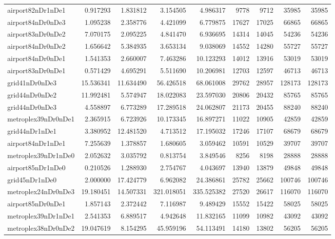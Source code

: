 \begin{longtable}{|l|r|r|r|r|r|r|r|r|}
airport82nDr1nDe1 & 0.917293 & 1.831812 & 3.154505 & 4.986317 & 9778 & 9712 & 35985 & 35985 \\
airport84nDr0nDe3 & 1.095238 & 2.358776 & 4.421099 & 6.779875 & 17627 & 17025 & 66865 & 66865 \\
airport83nDr0nDe2 & 7.070175 & 2.095225 & 4.841470 & 6.936695 & 14314 & 14045 & 54236 & 54236 \\
airport84nDr0nDe2 & 1.656642 & 5.384935 & 3.653134 & 9.038069 & 14552 & 14280 & 55727 & 55727 \\
airport84nDr0nDe1 & 1.541353 & 2.660007 & 7.463286 & 10.123293 & 14012 & 13916 & 53019 & 53019 \\
airport83nDr0nDe1 & 0.571429 & 4.695291 & 5.511690 & 10.206981 & 12703 & 12597 & 46713 & 46713 \\
grid41nDr0nDe3 & 15.536341 & 11.634490 & 56.426518 & 68.061008 & 29762 & 28957 & 128173 & 128173 \\
grid44nDr0nDe2 & 11.992481 & 5.574947 & 18.022083 & 23.597030 & 20806 & 20432 & 85765 & 85765 \\
grid44nDr0nDe3 & 4.558897 & 6.773289 & 17.289518 & 24.062807 & 21173 & 20455 & 88240 & 88240 \\
metroplex39nDr0nDe1 & 2.365915 & 6.723926 & 10.173345 & 16.897271 & 11022 & 10905 & 42859 & 42859 \\
grid44nDr1nDe1 & 3.380952 & 12.481520 & 4.713512 & 17.195032 & 17246 & 17107 & 68679 & 68679 \\
airport84nDr1nDe1 & 7.255639 & 1.378857 & 1.680605 & 3.059462 & 10591 & 10529 & 39707 & 39707 \\
metroplex39nDr1nDe0 & 2.052632 & 3.035792 & 0.813754 & 3.849546 & 8256 & 8198 & 28888 & 28888 \\
airport85nDr1nDe0 & 0.210526 & 1.288930 & 2.754767 & 4.043697 & 13940 & 13879 & 49848 & 49848 \\
grid45nDr1nDe0 & 2.000000 & 17.424779 & 6.962082 & 24.386861 & 25782 & 25662 & 100746 & 100746 \\
metroplex24nDr0nDe3 & 19.180451 & 14.507331 & 321.018051 & 335.525382 & 27520 & 26617 & 116070 & 116070 \\
airport85nDr0nDe1 & 1.857143 & 2.372442 & 7.116987 & 9.489429 & 15552 & 15422 & 58025 & 58025 \\
metroplex39nDr1nDe1 & 2.541353 & 6.889517 & 4.942648 & 11.832165 & 11099 & 10982 & 43092 & 43092 \\
metroplex38nDr0nDe2 & 19.047619 & 8.154295 & 45.959196 & 54.113491 & 14180 & 13802 & 56205 & 56205 \\

\end{longtable}
